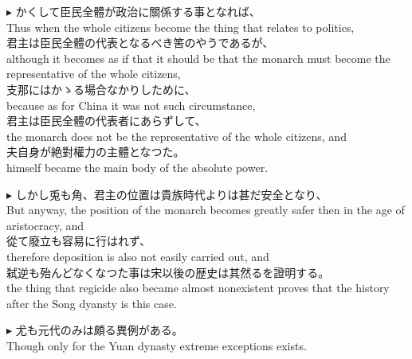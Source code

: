 \documentclass{ctexart}
\makeatletter
\newcommand*{\shifttext}[1]{%
  \settowidth{\@tempdima}{#1}%
  \hspace{-\@tempdima}#1%
}
\newcommand{\plabel}[1]{%
\shifttext{\textbf{#1}\quad}%
}
\makeatother
\begin{document}
\vspace{1em}
\plabel{$\blacktriangleright$}%
かくして臣民全體が政治に關係する事となれば、\\
Thus when the whole citizens become the thing that relates to politics,\\
君主は臣民全體の代表となるべき筈のやうであるが、\\
although it becomes as if that it should be that the monarch must become the representative of the whole citizens,\\
支那にはかゝる場合なかりしために、\\
because as for China it was not such circumstance,\\
君主は臣民全體の代表者にあらずして、\\
the monarch does not be the representative of the whole citizens, and \\
夫自身が絶對權力の主體となつた。\\
himself became the main body of the absolute power.

\vspace{1em}
\plabel{$\blacktriangleright$}%
しかし兎も角、君主の位置は貴族時代よりは甚だ安全となり、\\
But anyway, the position of the monarch becomes greatly safer then in the age of aristocracy, and\\
從て廢立も容易に行はれず、\\
therefore deposition is also not easily carried out, and\\
弑逆も殆んどなくなつた事は宋以後の歴史は其然るを證明する。\\
the thing that regicide also became almost nonexistent proves that the history after the Song dyansty is this case.

\vspace{1em}
\plabel{$\blacktriangleright$}%
尤も元代のみは頗る異例がある。\\
Though only for the Yuan dynasty extreme exceptions exists.
\end{document}
